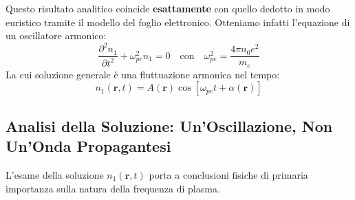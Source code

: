 Questo risultato analitico coincide \textbf{esattamente} con quello dedotto in modo euristico tramite il modello del foglio elettronico. Otteniamo infatti l'equazione di un oscillatore armonico:
\begin{equation}
\frac{\partial^2 n_1}{\partial t^2} + \omega_{pe}^2 n_1 = 0 \quad \text{con} \quad \omega_{pe}^2 = \frac{4\pi n_0 e^2}{m_e}
\end{equation}
La cui soluzione generale è una fluttuazione armonica nel tempo:
\begin{equation}
n_1(\mathbf{r}, t) = A(\mathbf{r}) \cos[\omega_{pe} t + \alpha(\mathbf{r})]
\end{equation}

\subsection{Analisi della Soluzione: Un'Oscillazione, Non Un'Onda Propagantesi}
L'esame della soluzione $n_1(\mathbf{r}, t)$ porta a conclusioni fisiche di primaria importanza sulla natura della frequenza di plasma.

